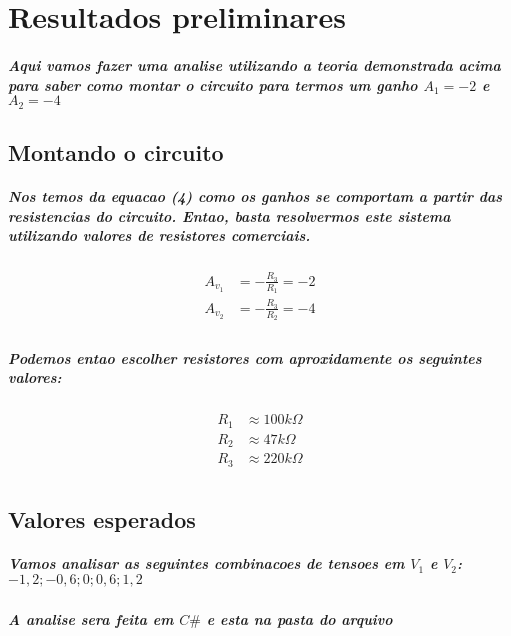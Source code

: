 \documentclass[12pt,twoside, a4paper, twocolumn]{article}
\begin{document}
\section{Resultados preliminares}

\subparagraph*{Aqui vamos fazer uma analise utilizando a teoria demonstrada acima para saber como montar o circuito para termos um ganho $A_1 = -2$ e $A_2 = -4$}
\subsection{Montando o circuito}
\subparagraph*{Nos temos da equacao (4) como os ganhos se comportam a partir das resistencias do circuito. Entao, basta resolvermos este sistema utilizando valores de resistores comerciais.}



\begin{equation}
    \begin{aligned}
        A_{v_1} & = -\frac{R_3}{R_1} = -2 \\
        A_{v_2} & = -\frac{R_3}{R_2} = -4 \\
    \end{aligned}
\end{equation}

\subparagraph*{Podemos entao escolher resistores com aproxidamente os seguintes valores:}

\begin{equation}
    \begin{aligned}
        R_1 & \approx 100k \varOmega \\
        R_2 & \approx 47k \varOmega  \\
        R_3 & \approx 220k \varOmega \\
    \end{aligned}
\end{equation}

\subsection{Valores esperados}

\subparagraph*{Vamos analisar as seguintes combinacoes de tensoes em $V_1$ e $V_2$: ${-1,2 ; -0,6 ; 0 ; 0,6 ; 1,2}$}

\subparagraph*{A analise sera feita em $C\#$ e esta na pasta do arquivo}
\end{document}
